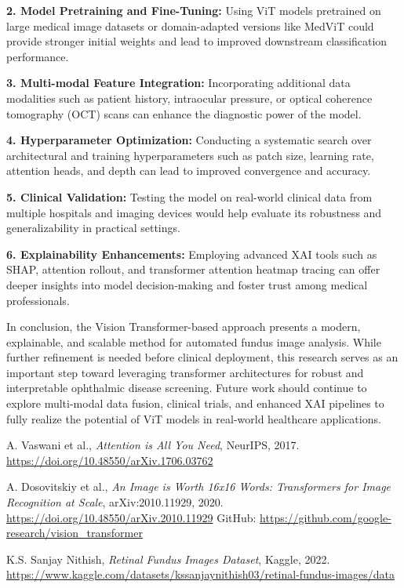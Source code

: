 \documentclass[a4paper,12pt]{report}
\begin{document}
\textbf{2. Model Pretraining and Fine-Tuning:} Using ViT models pretrained on large medical image datasets or domain-adapted versions like MedViT could provide stronger initial weights and lead to improved downstream classification performance.

\textbf{3. Multi-modal Feature Integration:} Incorporating additional data modalities such as patient history, intraocular pressure, or optical coherence tomography (OCT) scans can enhance the diagnostic power of the model.

\textbf{4. Hyperparameter Optimization:} Conducting a systematic search over architectural and training hyperparameters such as patch size, learning rate, attention heads, and depth can lead to improved convergence and accuracy.

\textbf{5. Clinical Validation:} Testing the model on real-world clinical data from multiple hospitals and imaging devices would help evaluate its robustness and generalizability in practical settings.

\textbf{6. Explainability Enhancements:} Employing advanced XAI tools such as SHAP, attention rollout, and transformer attention heatmap tracing can offer deeper insights into model decision-making and foster trust among medical professionals.

In conclusion, the Vision Transformer-based approach presents a modern, explainable, and scalable method for automated fundus image analysis. While further refinement is needed before clinical deployment, this research serves as an important step toward leveraging transformer architectures for robust and interpretable ophthalmic disease screening. Future work should continue to explore multi-modal data fusion, clinical trials, and enhanced XAI pipelines to fully realize the potential of ViT models in real-world healthcare applications.

\begin{thebibliography}{9}



A. Vaswani et al.,  
\textit{Attention is All You Need},  
NeurIPS, 2017.  
\url{https://doi.org/10.48550/arXiv.1706.03762}

A. Dosovitskiy et al.,  
\textit{An Image is Worth 16x16 Words: Transformers for Image Recognition at Scale},  
arXiv:2010.11929, 2020.  
\url{https://doi.org/10.48550/arXiv.2010.11929}  
GitHub: \url{https://github.com/google-research/vision_transformer}

K.S. Sanjay Nithish,  
\textit{Retinal Fundus Images Dataset},  
Kaggle, 2022.  
\url{https://www.kaggle.com/datasets/kssanjaynithish03/retinal-fundus-images/data}




\end{thebibliography}
\end{document}
